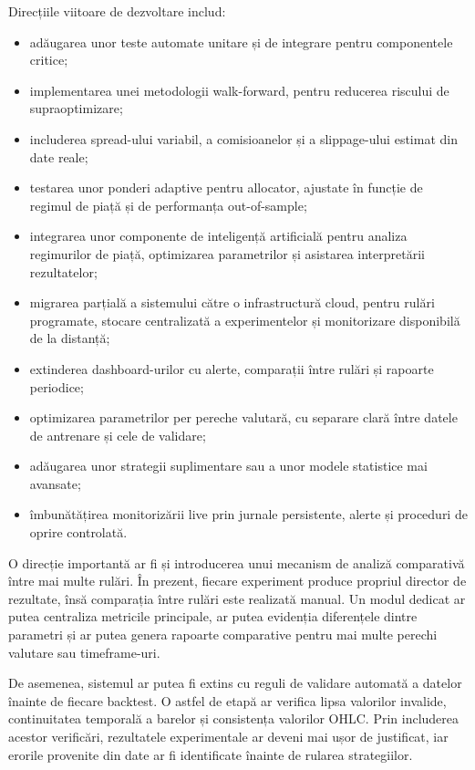 Direcțiile viitoare de dezvoltare includ:
\begin{itemize}
    \item adăugarea unor teste automate unitare și de integrare pentru componentele critice;
    \item implementarea unei metodologii walk-forward, pentru reducerea riscului de supraoptimizare;
    \item includerea spread-ului variabil, a comisioanelor și a slippage-ului estimat din date reale;
    \item testarea unor ponderi adaptive pentru allocator, ajustate în funcție de regimul de piață și de performanța out-of-sample;
    \item integrarea unor componente de inteligență artificială pentru analiza regimurilor de piață, optimizarea parametrilor și asistarea interpretării rezultatelor;
    \item migrarea parțială a sistemului către o infrastructură cloud, pentru rulări programate, stocare centralizată a experimentelor și monitorizare disponibilă de la distanță;
    \item extinderea dashboard-urilor cu alerte, comparații între rulări și rapoarte periodice;
    \item optimizarea parametrilor per pereche valutară, cu separare clară între datele de antrenare și cele de validare;
    \item adăugarea unor strategii suplimentare sau a unor modele statistice mai avansate;
    \item îmbunătățirea monitorizării live prin jurnale persistente, alerte și proceduri de oprire controlată.
\end{itemize}

O direcție importantă ar fi și introducerea unui mecanism de analiză comparativă între mai multe rulări. În prezent, fiecare experiment produce propriul director de rezultate, însă comparația între rulări este realizată manual. Un modul dedicat ar putea centraliza metricile principale, ar putea evidenția diferențele dintre parametri și ar putea genera rapoarte comparative pentru mai multe perechi valutare sau timeframe-uri.

De asemenea, sistemul ar putea fi extins cu reguli de validare automată a datelor înainte de fiecare backtest. O astfel de etapă ar verifica lipsa valorilor invalide, continuitatea temporală a barelor și consistența valorilor OHLC. Prin includerea acestor verificări, rezultatele experimentale ar deveni mai ușor de justificat, iar erorile provenite din date ar fi identificate înainte de rularea strategiilor.

